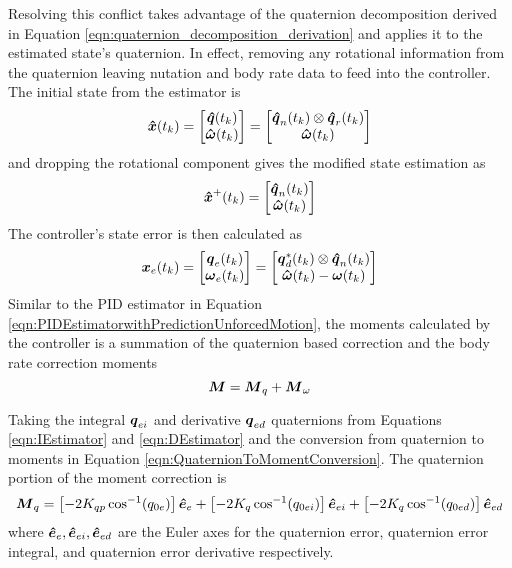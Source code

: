 Resolving this conflict takes advantage of the quaternion decomposition derived in Equation \ref{eqn:quaternion_decomposition_derivation} and applies it to the estimated state's quaternion.  In effect, removing any rotational information from the quaternion leaving nutation and body rate data to feed into the controller.  The initial state from the estimator is
\begin{equation}
  \boldsymbol{\hat{x}}(t_{k}) = \begin{bmatrix} \boldsymbol{\hat{q}}(t_{k}) \\ \boldsymbol{\hat{\omega}}(t_{k}) \end{bmatrix} = \begin{bmatrix} \boldsymbol{\hat{q}}_n(t_{k}) \otimes \boldsymbol{\hat{q}}_r(t_{k}) \\ \boldsymbol{\hat{\omega}}(t_{k}) \end{bmatrix}
\end{equation}
and dropping the rotational component gives the modified state estimation as
\begin{equation}
  \boldsymbol{\hat{x}}^+(t_{k}) = \begin{bmatrix} \boldsymbol{\hat{q}}_n(t_{k})  \\ \boldsymbol{\hat{\omega}}(t_{k}) \end{bmatrix}
\end{equation}
The controller's state error is then calculated as
\begin{equation}
  \boldsymbol{x}_e(t_{k}) = \begin{bmatrix} \boldsymbol{q}_e(t_{k}) \\ \boldsymbol{\omega}_e(t_{k}) \end{bmatrix} = \begin{bmatrix} \boldsymbol{q}_d^*(t_{k}) \otimes \boldsymbol{\hat{q}}_n(t_{k}) \\ \boldsymbol{\hat{\omega}}(t_{k}) - \boldsymbol{\omega}(t_{k}) \end{bmatrix}
\end{equation}
Similar to the PID estimator in Equation \ref{eqn:PIDEstimatorwithPredictionUnforcedMotion}, the moments calculated by the controller is a summation of the quaternion based correction and the body rate correction moments
\begin{equation}
  \boldsymbol{M} = \boldsymbol{M}_q + \boldsymbol{M}_{\omega}
\end{equation}

Taking the integral $\boldsymbol{q}_{ei}$ and derivative $\boldsymbol{q}_{ed}$ quaternions from Equations \ref{eqn:IEstimator} and \ref{eqn:DEstimator} and the conversion from quaternion to moments in Equation \ref{eqn:QuaternionToMomentConversion}.  The quaternion portion of the moment correction is
\begin{equation}
  \boldsymbol{M}_{q} = \left[-2 K_{qp} \cos^{-1} (q_{0e}) \right] \boldsymbol{\hat{e}}_e + \left[-2 K_{q} \cos^{-1} (q_{0ei}) \right] \boldsymbol{\hat{e}}_{ei} + \left[-2 K_{q} \cos^{-1} (q_{0ed}) \right] \boldsymbol{\hat{e}}_{ed}
\end{equation}
where $\boldsymbol{\hat{e}}_e, \boldsymbol{\hat{e}}_{ei}, \boldsymbol{\hat{e}}_{ed}$ are the Euler axes for the quaternion error, quaternion error integral, and quaternion error derivative respectively.

